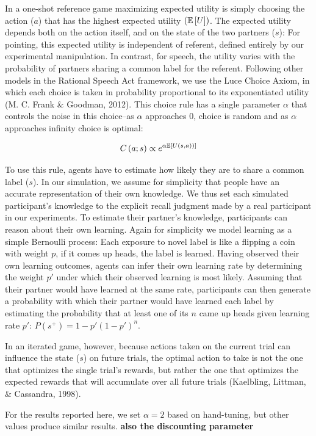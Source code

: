 \documentclass[10pt, letterpaper]{article}
\begin{document}
In a one-shot reference game maximizing expected utility is simply
choosing the action (\(a\)) that has the highest expected utility
\((\mathbb{E}\left[ U \right])\). The expected utility depends both on the action itself, and
on the state of the two partners (\(s\)): For pointing, this expected
utility is independent of referent, defined entirely by our experimental
manipulation. In contrast, for speech, the utility varies with the
probability of partners sharing a common label for the referent.
Following other models in the Rational Speech Act framework, we use the
Luce Choice Axiom, in which each choice is taken in probability
proportional to its exponentiated utility (M. C. Frank \& Goodman,
2012). This choice rule has a single parameter \(\alpha\) that controls
the noise in this choice--as \(\alpha\) approaches 0, choice is random
and as \(\alpha\) approaches infinity choice is optimal:

\[ 
C\left(a;s\right) \propto e^{\alpha \mathbb{E}\left[ U \left(s,a\right)) \right]}
\]

To use this rule, agents have to estimate how likely they are to share a
common label (\(s\)). In our simulation, we assume for simplicity that
people have an accurate representation of their own knowledge. We thus
set each simulated participant's knowledge to the explicit recall
judgment made by a real participant in our experiments. To estimate
their partner's knowledge, participants can reason about their own
learning. Again for simplicity we model learning as a simple Bernoulli
process: Each exposure to novel label is like a flipping a coin with
weight \(p\), if it comes up heads, the label is learned. Having
observed their own learning outcomes, agents can infer their own
learning rate by determining the weight \(p'\) under which their
observed learning is most likely. Assuming that their partner would have
learned at the same rate, participants can then generate a probability
with which their partner would have learned each label by estimating the
probability that at least one of its \(n\) came up heads given learning
rate \(p'\): \(P\left(s^{+}\right)=1-p'\left( 1-p' \right)^{n}\).

In an iterated game, however, because actions taken on the current trial
can influence the state (\(s\)) on future trials, the optimal action to
take is not the one that optimizes the single trial's rewards, but
rather the one that optimizes the expected rewards that will accumulate
over all future trials (Kaelbling, Littman, \& Cassandra, 1998).

For the results reported here, we set \(\alpha = 2\) based on
hand-tuning, but other values produce similar results. \textbf{also the
discounting parameter}
\end{document}
